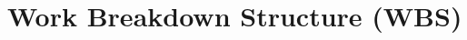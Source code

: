 \documentclass[twoside]{report}
\begin{document}
\section{Work Breakdown Structure (WBS)}
\begin{figure}[H]
  \caption*{}
\end{figure}
\end{document}
